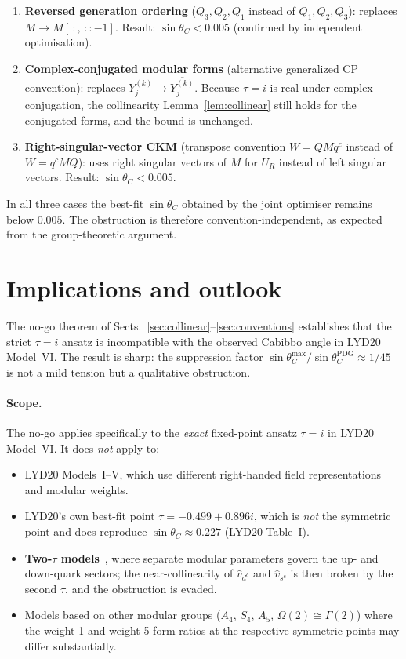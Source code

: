 \documentclass[a4paper,11pt]{article}
\newcommand{\sinTC}{\sin\theta_C}
\begin{document}
\begin{enumerate}
\item \textbf{Reversed generation ordering} ($Q_3,Q_2,Q_1$ instead of
  $Q_1,Q_2,Q_3$): replaces $M\to M[\,:,\,::-1]$.  Result:
  $\sinTC < 0.005$ (confirmed by independent optimisation).

\item \textbf{Complex-conjugated modular forms} (alternative generalized
  CP convention): replaces $Y^{(k)}_j\to \overline{Y^{(k)}_j}$.
  Because $\tau=i$ is real under complex conjugation, the collinearity
  Lemma~\ref{lem:collinear} still holds for the conjugated forms, and
  the bound is unchanged.

\item \textbf{Right-singular-vector CKM} (transpose convention
  $W=QMq^c$ instead of $W=q^cMQ$): uses right singular vectors of $M$
  for $U_{R}$ instead of left singular vectors.  Result:
  $\sinTC < 0.005$.
\end{enumerate}

In all three cases the best-fit $\sinTC$ obtained by the joint
optimiser remains below $0.005$.  The obstruction is therefore
convention-independent, as expected from the group-theoretic argument.

\section{Implications and outlook}
\label{sec:outlook}

The no-go theorem of Sects.~\ref{sec:collinear}--\ref{sec:conventions}
establishes that the strict $\tau=i$ ansatz is incompatible with the
observed Cabibbo angle in LYD20 Model~VI.  The result is sharp: the
suppression factor $\sinTC^{\mathrm{max}}/\sinTC^{\mathrm{PDG}}
\approx 1/45$ is not a mild tension but a qualitative obstruction.

\paragraph{Scope.}
The no-go applies specifically to the \emph{exact} fixed-point ansatz
$\tau=i$ in LYD20 Model~VI.  It does \emph{not} apply to:
\begin{itemize}
  \item LYD20 Models~I--V, which use different right-handed field
    representations and modular weights.
  \item LYD20's own best-fit point $\tau=-0.499+0.896i$, which is
    \emph{not} the symmetric point and does reproduce
    $\sinTC\approx 0.227$ (LYD20 Table~I).
  \item \textbf{Two-$\tau$ models}~\cite{DuWang22,AbbasKhalil22}, where
    separate modular parameters govern the up- and down-quark sectors;
    the near-collinearity of $\hat{v}_{d^c}$ and $\hat{v}_{s^c}$ is
    then broken by the second $\tau$, and the obstruction is evaded.
  \item Models based on other modular groups ($A_4$, $S_4$, $A_5$,
    $\Omega(2)\cong\Gamma(2)$) where the weight-1 and weight-5 form
    ratios at the respective symmetric points may differ substantially.
\end{itemize}
\end{document}
